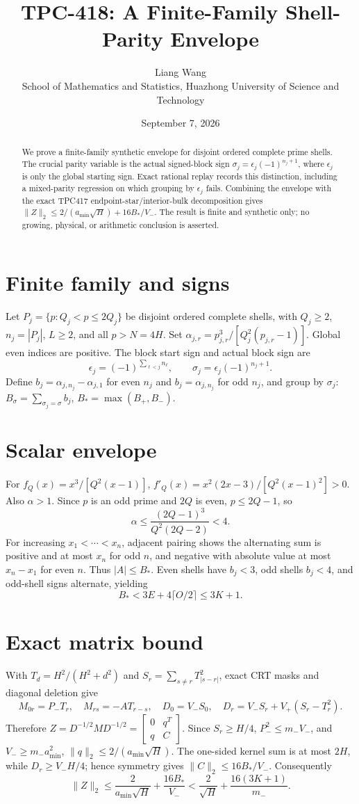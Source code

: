 \documentclass[11pt]{article}
\title{TPC-418: A Finite-Family Shell-Parity Envelope}
\author{Liang Wang\\School of Mathematics and Statistics, Huazhong University of Science and Technology}
\date{September 7, 2026}
\begin{document}
\maketitle
\begin{abstract}
We prove a finite-family synthetic envelope for disjoint ordered complete
prime shells. The crucial parity variable is the actual signed-block sign
$\sigma_j=\epsilon_j(-1)^{n_j+1}$, where $\epsilon_j$ is only the global
starting sign. Exact rational replay records this distinction, including a
mixed-parity regression on which grouping by $\epsilon_j$ fails. Combining the
envelope with the exact TPC417 endpoint-star/interior-bulk decomposition gives
$\|Z\|_2\le2/(a_{\min}\sqrt H)+16B_*/V_-$. The result is finite and synthetic
only; no growing, physical, or arithmetic conclusion is asserted.
\end{abstract}
\section{Finite family and signs}
Let $P_j=\{p:Q_j<p\le2Q_j\}$ be disjoint ordered complete shells, with
$Q_j\ge2$, $n_j=|P_j|$, $L\ge2$, and all $p>N=4H$. Set
$\alpha_{j,r}=p_{j,r}^3/[Q_j^2(p_{j,r}-1)]$. Global even indices are positive.
The block start sign and actual block sign are
\[
\epsilon_j=(-1)^{\sum_{\ell<j}n_\ell},\qquad
\sigma_j=\epsilon_j(-1)^{n_j+1}.
\]
Define $b_j=\alpha_{j,n_j}-\alpha_{j,1}$ for even $n_j$ and
$b_j=\alpha_{j,n_j}$ for odd $n_j$, and group by $\sigma_j$:
$B_\sigma=\sum_{\sigma_j=\sigma}b_j$, $B_* = \max(B_+,B_-)$.
\section{Scalar envelope}
For $f_Q(x)=x^3/[Q^2(x-1)]$,
$f'_Q(x)=x^2(2x-3)/[Q^2(x-1)^2]>0$. Also $\alpha>1$. Since $p$ is an
odd prime and $2Q$ is even, $p\le2Q-1$, so
\[
\alpha\le\frac{(2Q-1)^3}{Q^2(2Q-2)}<4.
\]
For increasing $x_1<\cdots<x_n$, adjacent pairing shows the alternating sum
is positive and at most $x_n$ for odd $n$, and negative with absolute value at
most $x_n-x_1$ for even $n$. Thus $|A|\le B_*$. Even shells have $b_j<3$,
odd shells $b_j<4$, and odd-shell signs alternate, yielding
\[
B_*<3E+4\lceil O/2\rceil\le3K+1.
\]
\section{Exact matrix bound}
With $T_d=H^2/(H^2+d^2)$ and
$S_r=\sum_{s\ne r}T_{|s-r|}^2$, exact CRT masks and diagonal deletion give
\[
M_{0r}=P_-T_r,\quad M_{rs}=-AT_{r-s},\quad
D_0=V_-S_0,\quad D_r=V_-S_r+V_+(S_r-T_r^2).
\]
Therefore $Z=D^{-1/2}MD^{-1/2}=\left[\begin{smallmatrix}0&q^T\\q&C\end{smallmatrix}\right]$.
Since $S_r\ge H/4$, $P_-^2\le m_-V_-$, and
$V_-\ge m_-a_{\min}^2$, $\|q\|_2\le2/(a_{\min}\sqrt H)$. The one-sided
kernel sum is at most $2H$, while $D_r\ge V_-H/4$; hence symmetry gives
$\|C\|_2\le16B_*/V_-$. Consequently
\[
\boxed{\|Z\|_2\le\frac2{a_{\min}\sqrt H}+\frac{16B_*}{V_-}
<\frac2{\sqrt H}+\frac{16(3K+1)}{m_-}}.
\]
\end{document}
